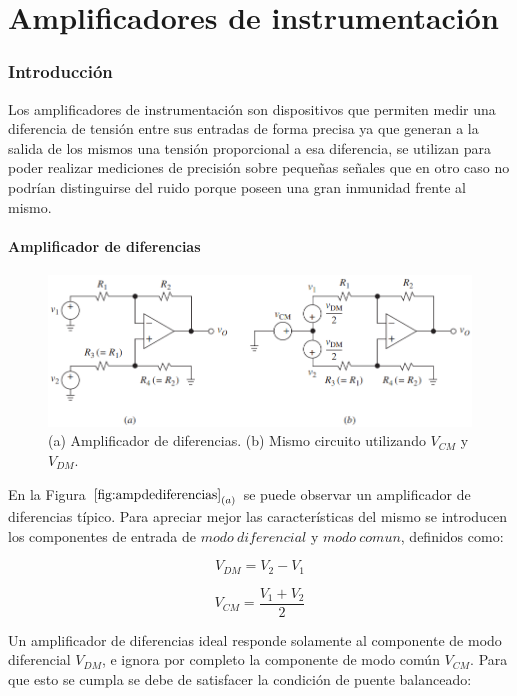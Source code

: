 \part{Amplificadores de instrumentación}
\section{Introducción}
	Los amplificadores de instrumentación son dispositivos que permiten medir una diferencia de tensión entre sus entradas de forma precisa ya que generan a la salida de los mismos una tensión proporcional a esa diferencia, se utilizan para poder realizar mediciones de precisión sobre pequeñas señales que en otro caso no podrían distinguirse del ruido porque poseen una gran inmunidad frente al mismo.
	
\subsection{Amplificador de diferencias}

\begin{figure}[H]
\centering
\includegraphics[scale=0.5]{../Ex3/ampdediferencias.png}
\caption{(a) Amplificador de diferencias. (b) Mismo circuito utilizando $V_{CM}$ y $V_{DM}$.}
\label{fig:ampdediferencias}
\end{figure}

	En la Figura $\ref{fig:ampdediferencias}_{(a)}$ se puede observar un amplificador de diferencias típico.
Para apreciar mejor las características del mismo se introducen los componentes de entrada de $\mathit{modo \ diferencial}$ y $\mathit{modo \ comun}$, definidos como:

\begin{equation}
\label{eq:VDM}
V_{DM} = V_2 - V_1
\end{equation}

\begin{equation}
\label{eq:VCM}
V_{CM} = \dfrac{V_1 + V_2}{2}
\end{equation}

	Un amplificador de diferencias ideal responde solamente al componente de modo diferencial $V_{DM}$, e ignora por completo la componente de modo común $V_{CM}$. Para que esto se cumpla se debe de satisfacer la condición de puente balanceado:
	
